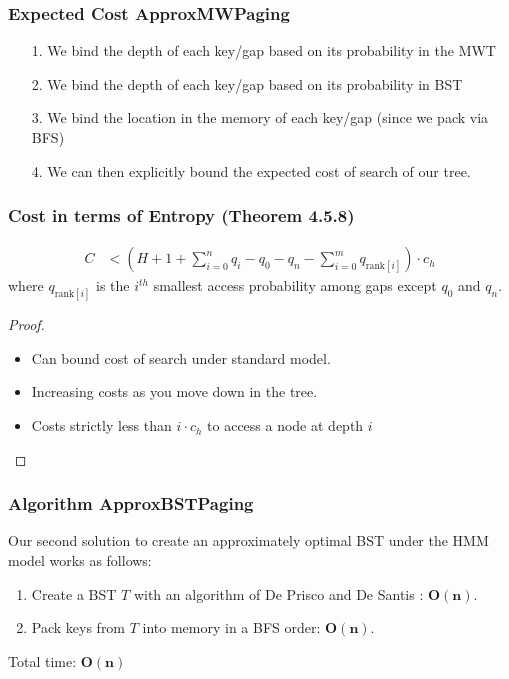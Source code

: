 \documentclass{beamer}
\theoremstyle{plain}
\begin{document}
\begin{frame} \frametitle{Expected Cost ApproxMWPaging} \label{45}
\begin{itemize}
\item[1.] We bind the depth of each key/gap based on its probability in the MWT 
\item[2.] We bind the depth of each key/gap based on its probability in BST
\item[3.] We bind the location in the memory of each key/gap (since we pack via BFS)
\item[4.] We can then explicitly bound the expected cost of search of our tree.
\end{itemize}
\end{frame}

\begin{frame}\frametitle{Cost in terms of Entropy (Theorem 4.5.8)}
\begin{align*}
C &< \left(H + 1 + \sum_{i=0}^n q_i - q_0 - q_n - \sum_{i=0}^m q_{\text{rank}[i]} \right) \cdot  c_h
\end{align*}
where $q_{\text{rank}[i]}$ is the $i^{th}$ smallest access probability among gaps except $q_0$ and $q_n$.
\begin{proof}
\begin{itemize}
\item Can bound cost of search under standard model.
\item Increasing costs as you move down in the tree.
\item Costs strictly less than $i \cdot c_h$ to access a node at depth $i$
\end{itemize}
\end{proof}
\end{frame}


\begin{frame} \frametitle{Algorithm ApproxBSTPaging}
Our second solution to create an approximately optimal BST under the HMM model works as follows: \\

\begin{enumerate}
\item Create a BST $T$ with an algorithm of De Prisco and De Santis \cite{de1993binary}: \textbf{$\mathbf{O(n)}$}. \\

\item Pack keys from $T$ into memory in a BFS order: \textbf{$\mathbf{O(n)}$}.
\end{enumerate}

Total time: $\mathbf{O(n)}$
\end{frame}
\end{document}
